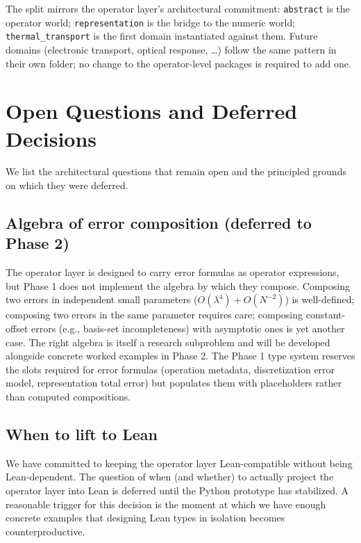 \documentclass[11pt,a4paper]{article}
\begin{document}
\noindent The split mirrors the operator layer's architectural commitment: \texttt{abstract}
is the operator world; \texttt{representation} is the bridge to the numeric world;
\texttt{thermal\_transport} is the first domain instantiated against them. Future
domains (electronic transport, optical response, …) follow the same pattern in their
own folder; no change to the operator-level packages is required to add one.

\section{Open Questions and Deferred Decisions}
\label{sec:open}

We list the architectural questions that remain open and the principled grounds on which they
were deferred.

\subsection{Algebra of error composition (deferred to Phase 2)}

The operator layer is designed to carry error formulas as operator expressions, but Phase 1 does not
implement the algebra by which they compose. Composing two errors in independent small parameters
($O(\lambda^4) + O(N^{-2})$) is well-defined; composing two errors in the same parameter requires
care; composing constant-offset errors (e.g., basis-set incompleteness) with asymptotic ones is
yet another case. The right algebra is itself a research subproblem and will be developed
alongside concrete worked examples in Phase 2. The Phase 1 type system reserves the slots
required for error formulas (operation metadata, discretization error model, representation
total error) but populates them with placeholders rather than computed compositions.

\subsection{When to lift to Lean}

We have committed to keeping the operator layer Lean-compatible without being Lean-dependent. The
question of when (and whether) to actually project the operator layer into Lean is deferred until
the Python prototype has stabilized. A reasonable trigger for this decision is the moment at
which we have enough concrete examples that designing Lean types in isolation becomes
counterproductive.
\end{document}
